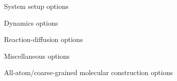 \newenvironment{optionSummary}[3]{
    \mdfsetup{skipabove=0pt,skipbelow=0pt,frametitleaboveskip=0pt,frametitlebelowskip=5pt,innerbottommargin=0pt,hidealllines=true,frametitlefont=\bfseries\color{darkgray}}
    \begin{mdframed}
	[frametitle=\begin{flushleft}Option:~\MakeLowercase{\code{#1}}\\Default:~\code{#2}\end{flushleft},
	backgroundcolor=white]
     \addtostream{stream#3}{#1 \par}
  }{\par\begin{flushleft}\hrulefill\end{flushleft}\end{mdframed}}


\newcommand{\optionHeader}[1]{{\bf \begin{center}#1\end{center}}}

\newcommand{\optionRuler}{\vspace{-0.2in}\hrulefill}

\optionHeader{System setup options}
\optionRuler
\begin{multicols}{3}
\end{multicols}

\optionHeader{Dynamics options}
\optionRuler
\begin{multicols}{3}
\end{multicols}

\optionHeader{Reaction-diffusion options}
\optionRuler
\begin{multicols}{3}
\end{multicols}

\optionHeader{Miscellaneous options}
\optionRuler
\begin{multicols}{3}
\end{multicols}

\optionHeader{All-atom/coarse-grained molecular construction options}
\optionRuler
\begin{multicols}{3}
\end{multicols}

